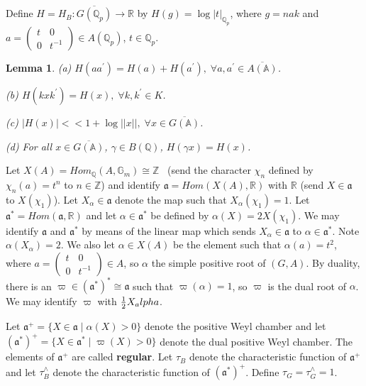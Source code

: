 \documentclass[12pt]{article}
\numberwithin{equation}{section}
\newtheorem{lemma}[theorem]{Lemma}
\def\aaa{\mathbb{A}}
\def\qqq{\mathbb{Q}}
\begin{document}
Define $H=H_B:\overline{G(\qqq_p)}\rightarrow \mathbb{R}$
by $H(g)=\log |t|_{\qqq_p}$, where $g=nak$ and $a=\left( 
\begin{array}{cc}
t & 0 \\ 
0 & t^{-1}
\end{array}
\right) \in A(\qqq_p)$, $t\in \qqq_p$.

\begin{lemma}\label{lem:2.5}
(a) $H(aa^{\prime })=H(a)+H(a^{\prime }),
\;\forall a,a^{\prime }\in \overline{A(\aaa )}$.

(b) $H(kxk^{\prime })=H(x),\;\forall k,k^{\prime }\in K$.

(c) $|H(x)|<<1+\log ||x||,\;\forall x\in \overline{G(\aaa )}$.

(d) For all $x\in \overline{G(\aaa )}$,
$\gamma \in B(\qqq)$, $H(\gamma x)=H(x)$.
\end{lemma}

Let $X(A)=Hom_{\qqq}(A,{\mathbb{G}}_m)\cong {\mathbb{Z}}$ \
(send the character $\chi _n$ defined by $\chi _n(a)=t^n$
to $n\in {\mathbb{Z}}$) and identify ${{\mathfrak{a}}}=Hom(X(A),\mathbb{R})$
with $\mathbb{R}$ (send $X\in {\mathfrak{a}}$ to $X(\chi _1)$).
Let $X_\alpha\in {\mathfrak{a}}$ denote the map such that
$X_\alpha (\chi_1)=1$.
Let ${\mathfrak{a}}^{*}=Hom({\mathfrak{a}},\mathbb{R})$ and let $\alpha \in {\mathfrak{a}}^{*}$
be defined by $\alpha (X)=2X(\chi _1)$.
We may identify ${\mathfrak{a}}$ and ${\mathfrak{a}}^*$ by means of the
linear map which sends
$X_\alpha\in {\mathfrak{a}}$ to $\alpha\in {\mathfrak{a}}^*$.
Note $\alpha(X_\alpha )=2$.
We also let $\alpha \in X(A)$ be the
element such that $\alpha (a)=t^2$, where $a=\left( 
\begin{array}{cc}
t & 0 \\ 
0 & t^{-1}
\end{array}
\right) \in A$, so $\alpha $ the simple positive root of $(G,A)$. By
duality, there is an $\varpi \in ({\mathfrak{a}}^{*})^{*}\cong {\mathfrak{a}}$
such that 
$\varpi (\alpha )=1$, so $\varpi $ is the dual root of $\alpha $. We
may identify $\varpi$ with ${1\over 2}X_alpha$.

Let ${\mathfrak{a}}^{+}=\{X\in {\mathfrak{a}}\;|\;\alpha (X)>0\}$
denote the positive
Weyl chamber and let
$({\mathfrak{a}}^{*})^{+}=\{X\in {\mathfrak{a}}^{*}\;|\;\varpi (X)>0\}$
denote the dual positive Weyl chamber. The elements of
${\mathfrak{a}}^{+} $ are called {\bf regular}. Let $\tau _B$ denote
the characteristic
function of ${\mathfrak{a}}^{+}$ and let $\tau _B^{\wedge }$ denote the
characteristic function of $({\mathfrak{a}}^{*})^{+}$.
Define $\tau _G=\tau _G^{\wedge }=1$.
\end{document}
